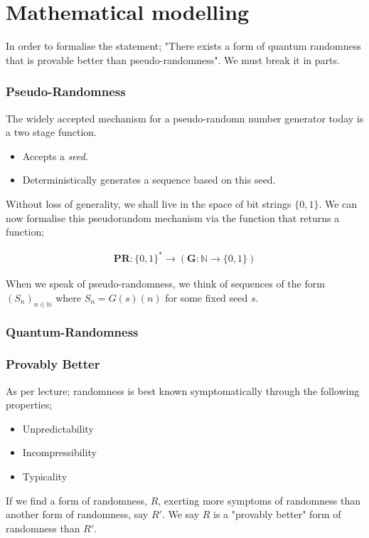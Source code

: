 \documentclass{article}
\begin{document}
\pagebreak
\section*{Mathematical modelling}
In order to formalise the statement; "There exists a form of quantum randomness that is provable better than pseudo-randomness". We must break it in parts.

\subsubsection*{Pseudo-Randomness}
The widely accepted mechanism for a pseudo-randomn number generator today is a two stage function.

\begin{itemize}
	\item{Accepts a \emph{seed}.}
	\item{Deterministically generates a sequence based on this seed.}
\end{itemize}

Without loss of generality, we shall live in the space of bit strings $\{0, 1\}$. We can now formalise this pseudorandom mechanism via the function that returns a function;

\begin{align*}
	\bm{PR}: \{0,1\}^* \rightarrow (\bm{G}: \mathbb{N} \rightarrow \{0,1\})
\end{align*}

When we speak of pseudo-randomness, we think of sequences of the form $(S_n)_{n \in \mathbb{N}}$ where $S_n = G(s)(n)$ for some fixed seed $s$.

\subsubsection*{Quantum-Randomness}

\subsubsection*{Provably Better}
As per lecture; randomness is best known symptomatically through the following properties;

\begin{itemize}
	\item Unpredictability
	\item Incompressibility 
	\item Typicality 
\end{itemize}

If we find a form of randomness, $R$, exerting more symptoms of randomness than another form of randomness, say $R'$. We say $R$ is a "provably better" form of randomness than $R'$.
\end{document}
